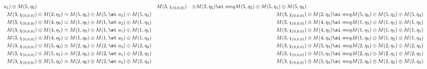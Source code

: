 \begin{align*}
a_{1}) \oplus M(5,\eta_{5}) &&& M(3,\chi_{(0,0,0)}) &\otimes M(2,\eta_{5}) \si\
meq M(5,\eta_{3}) \oplus M(5,\eta_{1}) \oplus M(5,\eta_{5})\\
M(3,\chi_{(0,0,0)}) &\otimes M(2,\eta_{2}) \simeq M(5,\eta_{0}) \oplus M(5,\et\
a_{2}) \oplus M(5,\eta_{4}) &&& M(3,\chi_{(0,0,0)}) &\otimes M(2,\eta_{4}) \si\
meq M(5,\eta_{0}) \oplus M(5,\eta_{2}) \oplus M(5,\eta_{4})\\
M(3,\chi_{(0,0,0)}) &\otimes M(4,\eta_{0}) \simeq M(1,\eta_{0}) \oplus M(1,\et\
a_{2}) \oplus M(1,\eta_{4}) &&& M(3,\chi_{(0,0,0)}) &\otimes M(4,\eta_{3}) \si\
meq M(1,\eta_{3}) \oplus M(1,\eta_{1}) \oplus M(1,\eta_{5})\\
M(3,\chi_{(0,0,0)}) &\otimes M(4,\eta_{1}) \simeq M(1,\eta_{3}) \oplus M(1,\et\
a_{1}) \oplus M(1,\eta_{5}) &&& M(3,\chi_{(0,0,0)}) &\otimes M(4,\eta_{5}) \si\
meq M(1,\eta_{3}) \oplus M(1,\eta_{1}) \oplus M(1,\eta_{5})\\
M(3,\chi_{(0,0,0)}) &\otimes M(4,\eta_{2}) \simeq M(1,\eta_{0}) \oplus M(1,\et\
a_{2}) \oplus M(1,\eta_{4}) &&& M(3,\chi_{(0,0,0)}) &\otimes M(4,\eta_{4}) \si\
meq M(1,\eta_{0}) \oplus M(1,\eta_{2}) \oplus M(1,\eta_{4})\\
M(3,\chi_{(0,0,0)}) &\otimes M(5,\eta_{0}) \simeq M(2,\eta_{0}) \oplus M(2,\et\
a_{2}) \oplus M(2,\eta_{4}) &&& M(3,\chi_{(0,0,0)}) &\otimes M(5,\eta_{3}) \si\
meq M(2,\eta_{3}) \oplus M(2,\eta_{1}) \oplus M(2,\eta_{5})\\
M(3,\chi_{(0,0,0)}) &\otimes M(5,\eta_{1}) \simeq M(2,\eta_{3}) \oplus M(2,\et\
a_{1}) \oplus M(2,\eta_{5}) &&& M(3,\chi_{(0,0,0)}) &\otimes M(5,\eta_{5}) \si\
meq M(2,\eta_{3}) \oplus M(2,\eta_{1}) \oplus M(2,\eta_{5})\\
M(3,\chi_{(0,0,0)}) &\otimes M(5,\eta_{2}) \simeq M(2,\eta_{0}) \oplus M(2,\et\
a_{2}) \oplus M(2,\eta_{4}) &&& M(3,\chi_{(0,0,0)}) &\otimes M(5,\eta_{4}) \si\
meq M(2,\eta_{0}) \oplus M(2,\eta_{2}) \oplus M(2,\eta_{4})\\
\end{align*}

